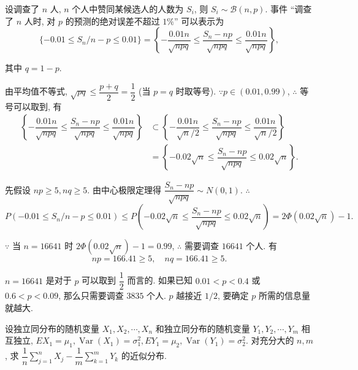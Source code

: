 \documentclass{ctexart}
\begin{document}
\begin{solution}
    设调查了 $n$ 人, $n$ 个人中赞同某候选人的人数为 $S_i$, 则 $S_i\sim\mathcal{B}(n,p)$. 事件 ``调查了 $n$ 人时, 对 $p$ 的预测的绝对误差不超过 $1\%$'' 可以表示为
    \[\{-0.01\leq S_n/n-p\leq0.01\}=\left\{-\dfrac{0.01n}{\sqrt{npq}}\leq\dfrac{S_n-np}{\sqrt{npq}}\leq\dfrac{0.01n}{\sqrt{npq}}\right\},\]

    其中 $q=1-p$.

    由平均值不等式, $\sqrt{pq}\leq\dfrac{p+q}{2}=\dfrac{1}{2}$ (当 $p=q$ 时取等号). $\because p\in(0.01,0.99)$, $\therefore$ 等号可以取到, 有
    \begin{align*}
        \left\{-\dfrac{0.01n}{\sqrt{npq}}\leq\dfrac{S_n-np}{\sqrt{npq}}\leq\dfrac{0.01n}{\sqrt{npq}}\right\} & \subset\left\{-\dfrac{0.01n}{\sqrt{n}/2}\leq\dfrac{S_n-np}{\sqrt{npq}}\leq\dfrac{0.01n}{\sqrt{n}/2}\right\} \\
        & =\left\{-0.02\sqrt{n}\leq\dfrac{S_n-np}{\sqrt{npq}}\leq0.02\sqrt{n}\right\}.
    \end{align*}

    先假设 $np\geq5,nq\geq5$. 由中心极限定理得 $\dfrac{S_n-np}{\sqrt{npq}}\sim N(0,1)$. $\therefore$
    \[P(-0.01\leq S_n/n-p\leq0.01)\leq P\left(-0.02\sqrt{n}\leq\dfrac{S_n-np}{\sqrt{npq}}\leq0.02\sqrt{n}\right)=2\Phi(0.02\sqrt{n})-1.\]

    $\because$ 当 $n=16641$ 时 $2\Phi(0.02\sqrt{n})-1=0.99$, $\therefore$ 需要调查 $16641$ 个人. 有
    \[np=166.41\geq5,\quad nq=166.41\geq5.\]
\end{solution}
\begin{note}
    $n=16641$ 是对于 $p$ 可以取到 $\dfrac{1}{2}$ 而言的. 如果已知 $0.01<p<0.4$ 或 $0.6<p<0.09$, 那么只需要调查 $3835$ 个人. $p$ 越接近 $1/2$, 要确定 $p$ 所需的信息量就越大.
\end{note}
\begin{exercise}%
    设独立同分布的随机变量 $X_1,X_2,\cdots,X_n$ 和独立同分布的随机变量 $Y_1,Y_2,\cdots,Y_m$ 相互独立, $EX_1=\mu_1,\operatorname{Var}(X_1)=\sigma_1^2,EY_1=\mu_2,\operatorname{Var}(Y_1)=\sigma_2^2$. 对充分大的 $n,m$, 求 $\dfrac{1}{n}\sum\limits_{j=1}^nX_j-\dfrac{1}{m}\sum\limits_{k=1}^mY_k$ 的近似分布.
\end{exercise}
\end{document}
